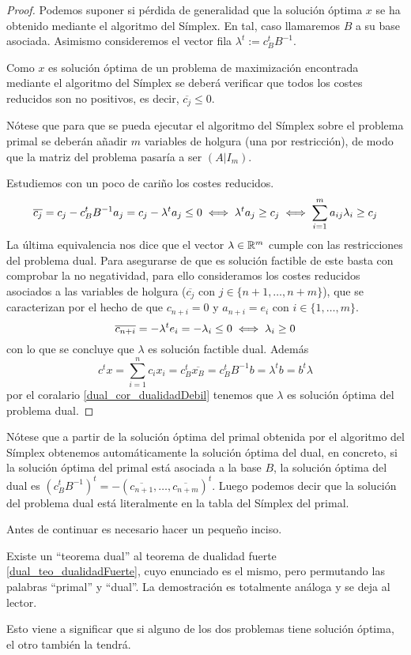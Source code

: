 \begin{proof}
	Podemos suponer si pérdida de generalidad que la solución óptima $x$ se ha obtenido mediante el algoritmo del Símplex. En tal, caso llamaremos $B$ a su base asociada. Asimismo consideremos el vector fila $\lambda^t:=c_B^tB^{-1}$.
	
	Como $x$ es solución óptima de un problema de maximización encontrada mediante el algoritmo del Símplex se deberá verificar que todos los costes reducidos son no positivos, es decir, $\overline{c_j}\leq 0$.
	
	Nótese que para que se pueda ejecutar el algoritmo del Símplex sobre el problema primal se deberán añadir $m$ variables de holgura (una por restricción), de modo que la matriz del problema pasaría a ser $(A|I_m)$.
	
	Estudiemos con un poco de cariño los costes reducidos.
	\begin{equation*}
		\overline{c_j}=c_j-c_B^tB^{-1}a_j=c_j-\lambda^ta_j\leq 0\iff \lambda^ta_j\geq c_j\iff \sum_{i=1}^{m}a_{ij}\lambda_i\geq c_j
	\end{equation*}
	La última equivalencia nos dice que el vector $\lambda\in\mathbb{R}^m$ cumple con las restricciones del problema dual. Para asegurarse de que es solución factible de este basta con comprobar la no negatividad, para ello consideramos los costes reducidos asociados a las variables de holgura ($\overline{c_j}$ con $j\in\{n+1,\dots,n+m\}$), que se caracterizan por el hecho de que $c_{n+i}=0$ y $a_{n+i}=e_i$ con $i\in\{1,\dots,m\}$.
	\begin{equation*}
		\overline{c_{n+i}}=-\lambda^te_i=-\lambda_i\leq 0\iff\lambda_i\geq 0 
	\end{equation*}
	con lo que se concluye que $\lambda$ es solución factible dual. Además
	\begin{equation*}
		c^tx=\sum_{i=1}^{n}c_ix_i=c_B^t\overline{x_B}=c_B^tB^{-1}b=\lambda^tb=b^t\lambda
	\end{equation*}
	por el coralario \ref{dual_cor_dualidadDebil} tenemos que $\lambda$ es solución óptima del problema dual.
\end{proof}
\begin{obs}[Construcción]
	Nótese que a partir de la solución óptima del primal obtenida por el algoritmo del Símplex obtenemos automáticamente la solución óptima del dual, en concreto, si la solución óptima del primal está asociada a la base $B$, la solución óptima del dual es $(c_B^tB^{-1})^t=-(\overline{c_{n+1}},\dots,\overline{c_{n+m}})^t$. Luego podemos decir que la solución del problema dual está literalmente en la tabla del Símplex del primal.
\end{obs}
Antes de continuar es necesario hacer un pequeño inciso.
\begin{obs}
	\label{dual_obs_dual}
	Existe un ``teorema dual'' al teorema de dualidad fuerte \ref{dual_teo_dualidadFuerte}, cuyo enunciado es el mismo, pero permutando las palabras ``primal'' y ``dual''. La demostración es totalmente análoga y se deja al lector.
	
	Esto viene a significar que si alguno de los dos problemas tiene solución óptima, el otro también la tendrá.
\end{obs}

